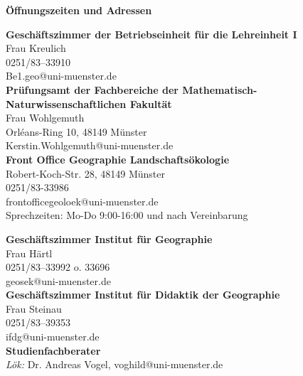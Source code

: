 \begin{small}
\begin{center}
\textbf{ Öffnungszeiten und Adressen}
\end{center}
\end{small}
\begin{tiny}
\sffamily
\begin{minipage}[t]{0.5\textwidth}
 \begin{center}
\textbf{Geschäftszimmer der Betriebseinheit für die Lehreinheit I}\\
Frau Kreulich\\
0251/83--33910 \\
Be1.geo@uni-muenster.de\\
\bigskip 
\textbf{Prüfungsamt der Fachbereiche der Mathematisch- Naturwissenschaftlichen Fakultät}\\
Frau Wohlgemuth\\
Orléans-Ring 10, 48149 Münster\\
Kerstin.Wohlgemuth@uni-muenster.de\\
\bigskip
\textbf{Front Office Geographie Landschaftsökologie}\\
Robert-Koch-Str. 28, 48149 Münster\\
0251/83-33986\\
frontofficegeoloek@uni-muenster.de\\
Sprechzeiten: Mo-Do 9:00-16:00 und nach Vereinbarung
\bigskip         	
\end{center}
\end{minipage}
\begin{minipage}[t]{0.5\textwidth}
\begin{center}
 \textbf{Geschäftszimmer Institut für Geographie}\\
  Frau Härtl\\
  0251/83--33992 o. 33696\\
  geosek@uni-muenster.de\\
 \bigskip
\textbf{Geschäftszimmer Institut für Didaktik der Geographie}\\
Frau Steinau\\
0251/83--39353\\
ifdg@uni-muenster.de\\
\bigskip
\textbf{Studienfachberater}\\
\textit{Lök:} Dr. Andreas Vogel, voghild@uni-muenster.de\\

\end{center}
\end{minipage}
\end{tiny}
